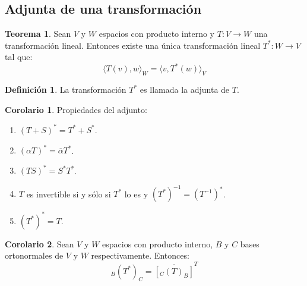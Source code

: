 \documentclass[10pt]{article}
\theoremstyle{definition}
\newtheorem{definition}{Definición}[section]
\newtheorem{theorem}{Teorema}[section]
\newtheorem{corollary}{Corolario}[theorem]
\begin{document}
\subsection{Adjunta de una transformación}
\begin{theorem}
    Sean $V$ y $W$ espacios con producto interno y $T:V\to W$ una transformación lineal. Entonces existe una única transformación lineal $T^*:W\to V$ tal que: $$\langle T(v),w\rangle_W=\langle v,T^*(w)\rangle_V$$
\end{theorem}
\begin{definition}
    La transformación $T^*$ es llamada la adjunta de $T$.
\end{definition}
\begin{corollary}
    Propiedades del adjunto:
    \begin{enumerate}
        \item $(T+S)^*=T^*+S^*$.
        \item $(\alpha T)^*=\overline{\alpha}T^*$.
        \item $(TS)^*=S^*T^*$.
        \item $T$ es invertible si y sólo si $T^*$ lo es y $(T^*)^{-1}=(T^{-1})^*$.
        \item $(T^*)^*=T$.
    \end{enumerate}
\end{corollary}
\begin{corollary}
    Sean $V$ y $W$ espacios con producto interno, $B$ y $C$ bases ortonormales de $V$ y $W$ respectivamente. Entonces:$$_B(T^*)_C=\overline{[_C(T)_B]}^T$$
\end{corollary}
\end{document}
